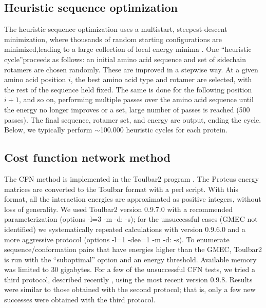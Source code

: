 \subsection{Heuristic sequence optimization}
The heuristic sequence optimization uses a multistart, steepest-descent minimization, where thousands of random starting configurations are minimized,leading to a large collection of local energy minima \cite{Wernisch00,Schmidt08}.
One ``heuristic cycle''proceeds as follows: an initial amino acid sequence and set of sidechain rotamers are chosen randomly. These are improved in a stepwise way. At a given amino acid position $i$, the best amino acid type and rotamer are selected, with the rest of the sequence held fixed. The same is done for the following position $i+1$, and so on, performing multiple passes over the amino acid sequence until the energy no longer improves or a set, large number of passes is reached (500 passes). The final sequence, rotamer set, and energy are output, ending the cycle. Below, we typically perform  ${\sim}$100.000 heuristic cycles for each protein.

\subsection{Cost function network method}
The CFN method is implemented in the Toulbar2 program \cite{Traore13,Allouche14}. The Proteus energy matrices are converted to the Toulbar format with a perl script. With this format, all the interaction energies are approximated as positive integers, without loss of generality. We used Toulbar2 version 0.9.7.0 with a recommended parameterization (options -l=3 -m -d: -s); for the unsuccessful cases (GMEC not identified) we systematically repeated calculations with version 0.9.6.0 and a more aggressive protocol (options -l=1 -dee=1 -m -d: -s). To enumerate sequence/conformation pairs that have energies higher than the GMEC, Toulbar2 is run with the ``suboptimal'' option and an energy threshold. Available memory was limited to 30 gigabytes. For a few of the unsuccessful CFN tests, we tried a third protocol, described recently \cite{Simoncini15}, using the most recent version 0.9.8. Results were similar to those obtained with the second protocol; that is, only a few new successes were obtained with the third protocol.


